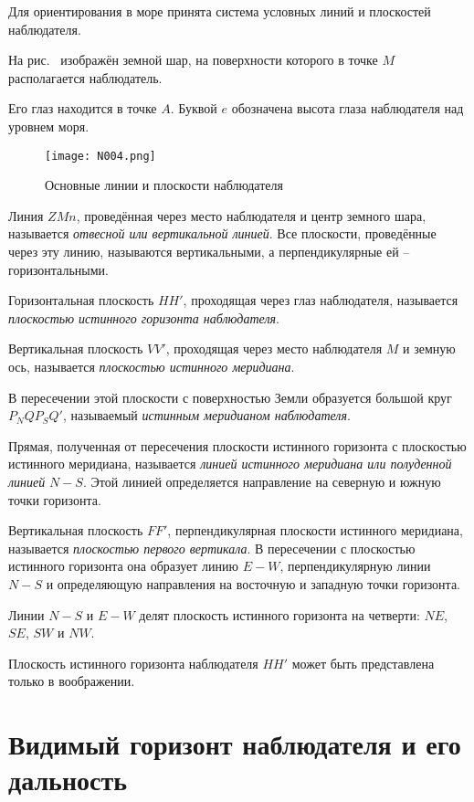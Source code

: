 Для ориентирования в море принята система условных линий и плоскостей
наблюдателя.

На рис.~ изображён земной шар, на поверхности которого в точке
$M$ располагается наблюдатель.

Его глаз находится в точке $A$. Буквой $e$ обозначена высота глаза
наблюдателя над уровнем моря.

\begin{figure}[htb]
  \centering{}
  \texttt{[image: N004.png]}
  \caption{Основные линии и плоскости наблюдателя}
  \label{fig:N4}
\end{figure}

Линия $ZMn$, проведённая через место наблюдателя и центр земного шара,
называется \textit{отвесной или вертикальной линией}. Все плоскости,
проведённые через эту линию, называются вертикальными, а
перпендикулярные ей \--- горизонтальными.

Горизонтальная плоскость $HH'$, проходящая через глаз наблюдателя,
называется \textit{плоскостью истинного горизонта наблюдателя}.

Вертикальная плоскость $VV'$, проходящая через место наблюдателя $M$ и
земную ось, называется \textit{плоскостью истинного меридиана}.

В пересечении этой плоскости с поверхностью Земли образуется большой
круг $P_NQP_SQ'$, называемый \textit{истинным меридианом наблюдателя}.

Прямая, полученная от пересечения плоскости истинного горизонта с
плоскостью истинного меридиана, называется \textit{линией истинного меридиана
или полуденной линией} $N-S$. Этой линией определяется направление на
северную и южную точки горизонта.

Вертикальная плоскость $FF'$, перпендикулярная плоскости истинного
меридиана, называется \textit{плоскостью первого вертикала}. В пересечении с
плоскостью истинного горизонта она образует линию $E-W$,
перпендикулярную линии $N-S$ и определяющую направления на восточную и
западную точки горизонта.

Линии $N-S$ и $E-W$ делят плоскость истинного горизонта на четверти:
$NE$, $SE$, $SW$ и $NW$.

Плоскость истинного горизонта наблюдателя $HH'$ может быть
представлена только в воображении.

\section{Видимый горизонт наблюдателя и его дальность}

